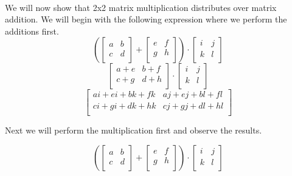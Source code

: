 \documentclass{article}
\begin{document}
        \paragraph{}
        We will now show that 2x2 matrix multiplication distributes over matrix addition. We will begin with the following expression where we perform the additions first.
        \[
            \left(
            \left[ {\begin{array}{cc}
                a & b \\
                c & d \\
            \end{array} } \right]
            +
            \left[ {\begin{array}{cc}
                e & f \\
                g & h \\
            \end{array} } \right]
            \right)
        \cdot
            \left[ {\begin{array}{cc}
            i & j \\
            k & l \\
            \end{array} } \right]
        \]
        \[
            \left[ {\begin{array}{cc}
                a+e & b+f \\
                c+g & d+h \\
            \end{array} } \right]
        \cdot
            \left[ {\begin{array}{cc}
            i & j \\
            k & l \\
            \end{array} } \right]
        \]
        \[
            \left[ {\begin{array}{cc}
                ai+ei + bk+fk & aj+ej + bl+fl\\
                ci+gi + dk+hk & cj+gj+dl+hl \\
            \end{array} } \right]
        \]

        Next we will perform the multiplication first and observe the results.

        \[
            \left(
            \left[ {\begin{array}{cc}
                a & b \\
                c & d \\
            \end{array} } \right]
            +
            \left[ {\begin{array}{cc}
                e & f \\
                g & h \\
            \end{array} } \right]
            \right)
        \cdot
            \left[ {\begin{array}{cc}
            i & j \\
            k & l \\
            \end{array} } \right]
        \]
\end{document}
